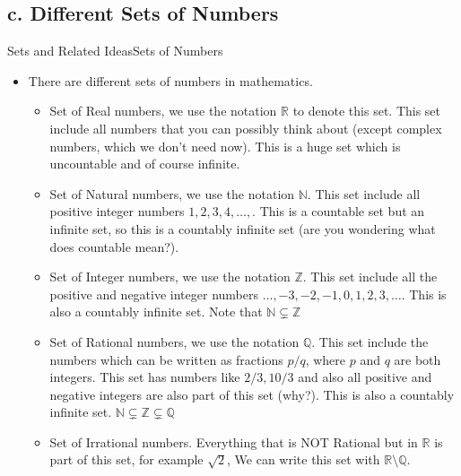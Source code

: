 \documentclass[8pt,usepdftitle=false]{beamer}
\begin{document}
\subsection{c. Different Sets of Numbers}
\frame{\subsectionpage}
\begin{frame}[allowframebreaks]{Sets and Related Ideas}{Sets of Numbers}




\begin{itemize}
\item There are different \alert{sets of numbers} in mathematics. 
\vspace*{.1cm}


\begin{itemize}
\item \alert{Set of Real numbers}, we use the notation $\mathbb{R}$ to denote this set. This set include all numbers that you can possibly think about (except complex numbers, which we don't need now). This is a huge set which is \alert{uncountable} and of course \alert{infinite}.

\medskip

\item \alert{Set of Natural numbers}, we use the notation $\mathbb{N}$. This set include all positive integer numbers $1, 2, 3, 4, \ldots, $. This is a \alert{countable set} but an infinite set, so this is a \alert{countably infinite} set (are you wondering what does countable mean?).

\medskip

\item \alert{Set of Integer numbers}, we use the notation $\mathbb{Z}$. This set include all the positive and negative integer numbers $\ldots, -3, -2, -1, 0, 1, 2, 3, \ldots$. This is also a \alert{countably infinite set}. Note that $\mathbb{N} \subsetneq \mathbb{Z} $

\medskip

\item \alert{Set of Rational numbers}, we use the notation $\mathbb{Q}$. This set include the numbers which can be written as fractions $p/q$, where $p$ and $q$ are both integers. This set has numbers like $2/3, 10/3$ and also all positive and negative integers are also part of this set (why?). This is also a \alert{countably infinite set}.  $\mathbb{N} \subsetneq \mathbb{Z} \subsetneq \mathbb{Q} $

\medskip

\item \alert{Set of Irrational numbers}. Everything that is NOT Rational but in $\mathbb{R}$ is part of this set, for example $\sqrt{2}$, We can write this set with $\mathbb{R} \setminus \mathbb{Q}$.


\end{itemize}
\end{itemize}
\end{frame}
\end{document}
